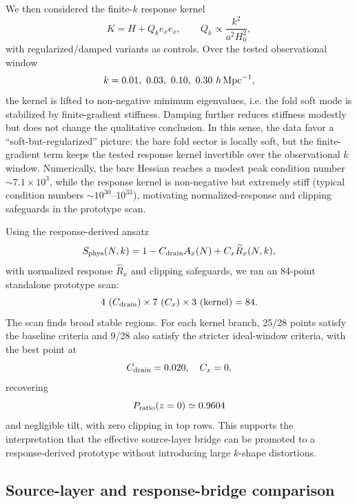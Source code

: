 ﻿\documentclass[11pt,prd,preprint,nofootinbib,amsmath,amssymb]{revtex4-2}
\begin{document}
We then considered the finite-$k$ response kernel
\begin{equation}
K=H+Q_k e_xe_x,
\qquad
Q_k\propto \frac{k^2}{a^2H_0^2},
\end{equation}
with regularized/damped variants as controls. Over the tested observational window
\begin{equation}
k=0.01,\ 0.03,\ 0.10,\ 0.30\ h\,{\rm Mpc}^{-1},
\end{equation}
the kernel is lifted to non-negative minimum eigenvalues, i.e. the fold soft mode is stabilized by finite-gradient stiffness. Damping further reduces stiffness modestly but does not change the qualitative conclusion.
In this sense, the data favor a ``soft-but-regularized'' picture: the bare fold sector is locally soft, but the finite-gradient term keeps the tested response kernel invertible over the observational $k$ window. Numerically, the bare Hessian reaches a modest peak condition number $\sim 7.1\times10^3$, while the response kernel is non-negative but extremely stiff (typical condition numbers $\sim10^{30}$--$10^{33}$), motivating normalized-response and clipping safeguards in the prototype scan.

Using the response-derived ansatz
\begin{equation}
S_{\rm phys}(N,k)=1-C_{\rm drain}A_x(N)+C_x\widehat R_x(N,k),
\end{equation}
with normalized response $\widehat R_x$ and clipping safeguards, we ran an 84-point standalone prototype scan:
\begin{equation}
4\ (C_{\rm drain})\times 7\ (C_x)\times 3\ ({\rm kernel})=84.
\end{equation}
The scan finds broad stable regions. For each kernel branch, 25/28 points
satisfy the baseline criteria and 9/28 also satisfy the stricter ideal-window
criteria, with the best point at
\begin{equation}
C_{\rm drain}=0.020,\quad C_x=0,
\end{equation}
recovering
\begin{equation}
P_{\rm ratio}(z=0)\simeq0.9604
\end{equation}
and negligible tilt, with zero clipping in top rows. This supports the interpretation that the effective source-layer bridge can be promoted to a response-derived prototype without introducing large $k$-shape distortions.

\subsection{Source-layer and response-bridge comparison}
\end{document}
